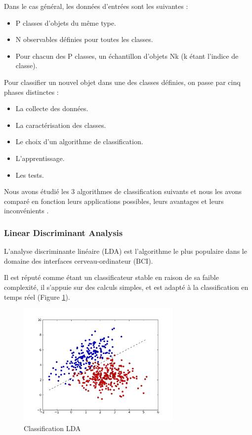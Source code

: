 Dans le cas général, les données d'entrées sont les suivantes :
\smallbreak
\begin{itemize}
	\item P classes d'objets du même type.
	\smallbreak
	\item N observables définies pour toutes les classes.
	\smallbreak
	\item Pour chacun des P classes, un échantillon d'objets Nk  (k étant l'indice de classe).
	\smallbreak
\end{itemize}

Pour classifier un nouvel objet dans une des classes définies, on passe par cinq phases distinctes :
\smallbreak
\begin{itemize}
	\item La collecte des données.
	\smallbreak
	\item La caractérisation des classes.
	\smallbreak
	\item Le choix d'un algorithme de classification.
	\smallbreak
	\item L'apprentissage.
	\smallbreak
	\item Les tests.
	\smallbreak
\end{itemize}

Nous avons étudié les 3 algorithmes de classification suivants et nous les avons comparé en fonction leurs applications possibles, leurs avantages et leurs inconvénients \cite{Faivre}.

\subsubsection{Linear Discriminant Analysis}
\label{Subsubsection : 4.Linear Discriminant Analysis}
L'analyse discriminante linéaire (LDA) est l'algorithme le plus populaire dans le domaine des interfaces cerveau-ordinateur (BCI).

Il est réputé comme étant un classificateur stable en raison de sa faible complexité, il s'appuie sur des calculs simples, et est adapté à la classification en temps réel (Figure \ref*{classiLDA}).
 
\begin{figure}[h]
	\centering\includegraphics[width=8cm]{images/lda.png}
	\caption{Classification LDA}
	\label{classiLDA}
\end{figure}

